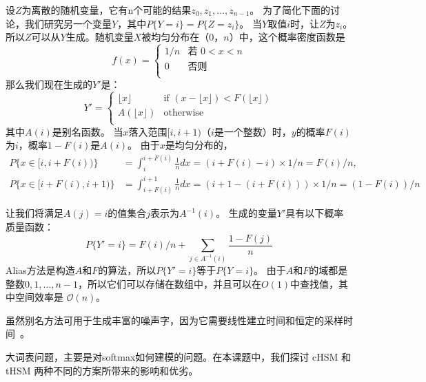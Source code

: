 设$ Z $为离散的随机变量，它有n个可能的结果$ z_0,z_1,\ldots,z_ {n-1} $。 为了简化下面的讨论，我们研究另一个变量$ Y $，其中$ P \{Y = i \} = P \{Z = z_i \} $。 当$ Y $取值$ i $时，让$ Z $为$ z_i $。 所以$ Z $可以从$ Y $生成。随机变量$ X $被均匀分布在$（0，n）$中，这个概率密度函数是
\begin{equation}\label{equ:alias}
 f(x) = \left\{
 \begin{array}{rl}
  1/n & \text{若 } 0 < x < n\\
  0 & \text{否则}\\
 \end{array} \right.
\end{equation}
那么我们现在生成的$Y'$是：
\begin{equation}\label{equ:gen}
  Y' =  \left\{
 \begin{array}{rl}
  \lfloor x  \rfloor & \text{if } (x - \lfloor x \rfloor) < F(\lfloor x \rfloor)\\
  A(\lfloor x \rfloor)  & \text{otherwise}\\
 \end{array} \right.
\end{equation}
其中$ A(i)$是别名函数。 当$ x $落入范围$ [i,i + 1)$（$ i $是一个整数）时，$ y $的概率$ F(i)$为$ i $，概率$ 1 - F(i )$是$ A(i)$。 由于$ x $是均匀分布的，
\begin{equation}
  \begin{split}
P\{x \in [i, i + F(i))\}     &= \int_i^{i+F(i)}\frac{1}{n}dx= (i + F(i) - i) \times 1/n= F(i)/n,\\
P\{x \in [i + F(i), i + 1)\} &= \int_{i+F(i)}^{i+1}\frac{1}{n}dx= (i + 1 - (i + F(i))) \times 1/n= (1-F(i))/n
\end{split}
\end{equation}

让我们将满足$ A(j)= i $的值集合$ j $表示为$ A ^ { - 1}(i)$。 生成的变量$ Y'$具有以下概率质量函数：
\begin{equation}
  P\{Y' = i\} = F(i)/n + \sum_{j \in A^{-1}(i)}\frac{1-F(j)}{n}
\end{equation}
Alias方法是构造$ A $和$ F $的算法，所以$ P \{Y'= i \} $等于$ P\{Y = i \} $。 由于$ A $和$ F $的域都是整数$ 0,1,\ldots, n-1 $，所以它们可以存储在数组中，并且可以在$O(1)$中查找值，其中空间效率是 $\mathcal{O}(n)$。

虽然别名方法可用于生成丰富的噪声字，因为它需要线性建立时间和恒定的采样时间~。

大词表问题，主要是对softmax如何建模的问题。在本课题中，我们探讨 cHSM 和 tHSM 两种不同的方案所带来的影响和优劣。
